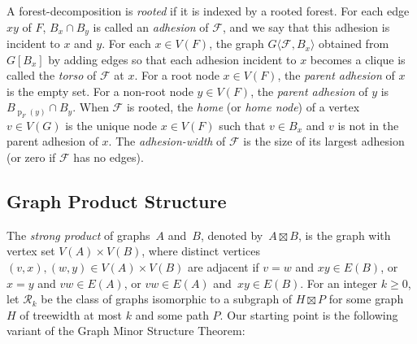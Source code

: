 \documentclass{patmorin}
\renewcommand{\geq}{\geqslant}
\newcommand{\defin}[1]{\emph{\textcolor{brightmaroon}{#1}}}
\newcommand{\torso}[2]{{#1}\langle{#2}\rangle}
\DeclareMathOperator{\parent}{p}
\newcommand{\calF}{\mathcal{F}}
\newcommand{\calR}{\mathcal{R}}
\begin{document}
A forest-decomposition is \defin{rooted} if it is indexed by a rooted forest. For each edge $xy$ of $F$, $B_x\cap B_y$ is called an \defin{adhesion} of $\calF$, and we say that this adhesion is incident to $x$ and $y$.  For each $x\in V(F)$, the graph \defin{$\torso{G}{\calF,B_x}$} obtained from $G[B_x]$ by adding edges so that each adhesion incident to $x$ becomes a clique is called the \defin{torso} of $\calF$ at $x$. For a root node $x\in V(F)$, the \defin{parent adhesion} of $x$ is the empty set. For a non-root node $y\in V(F)$, the \defin{parent adhesion} of $y$ is $B_{\parent_F(y)}\cap B_y$. When $\calF$ is rooted, the \defin{home} (or \defin{home node}) of a vertex $v\in V(G)$ is the unique node $x\in V(F)$ such that $v\in B_x$ and $v$ is not in the parent adhesion of $x$.  The \defin{adhesion-width} of $\calF$ is the size of its largest adhesion (or zero if $\calF$ has no edges).






\subsection{Graph Product Structure}

The \defin{strong product} of graphs~$A$ and~$B$, denoted by~${A \boxtimes B}$, is the graph with vertex set ${V(A) \times V(B)}$, where distinct vertices ${(v,x),(w,y) \in V(A) \times V(B)}$ are adjacent if
${v=w}$ and ${xy \in E(B)}$, or
${x=y}$ and ${vw \in E(A)}$, or
${vw \in E(A)}$ and~${xy \in E(B)}$.
For an integer $k\geq 0$, let \defin{$\calR_{k}$} be the class of graphs isomorphic to a subgraph of $H\boxtimes P$ for some graph $H$ of treewidth at most $k$ and some path $P$.  
Our starting point is the following variant of the Graph Minor Structure Theorem:
\end{document}
